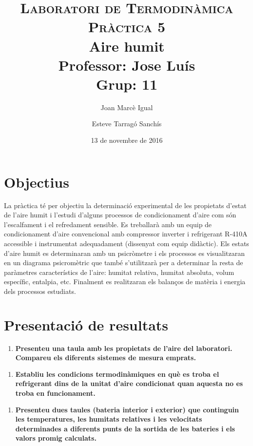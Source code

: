 \documentclass[a4paper]{article}
\title{
	\textsc{Laboratori de Termodinàmica} \\
	\textsc{Pràctica 5} \\
	Aire humit \\
	\large
	Professor: Jose Luís \\ Grup: 11 }
\author{Joan Marcè Igual \and Esteve Tarragó Sanchís}
\date{13 de novembre de 2016}
\newenvironment{questionenum}{%
	\setlist[enumerate]{resume}
	\restartlist{enumerate}
	\newcommand{\question}[1]{
		\begin{enumerate}
			\item\bfseries ##1
		\end{enumerate}
}}{%
}
\begin{document}
\maketitle

\section{Objectius}

La pràctica té per objectiu la determinació experimental de les propietats d'estat de l'aire humit i l'estudi d'alguns processos de condicionament d'aire com són l'escalfament i el refredament sensible. Es treballarà amb un equip de condicionament d'aire convencional amb compressor inverter i refrigerant R-410A accessible i instrumentat adequadament (dissenyat com equip didàctic). Els estats d'aire humit es determinaran amb un psicròmetre i els processos es visualitzaran en un diagrama psicromètric que també s'utilitzarà per a determinar la resta de paràmetres característics de l'aire: humitat relativa, humitat absoluta, volum específic, entalpia, etc. Finalment es realitzaran els balanços de matèria i energia dels processos estudiats.

\section{Presentació de resultats}

\begin{questionenum}
	\question{Presenteu una taula amb les propietats de l'aire del laboratori. Compareu els diferents sistemes de mesura emprats.}
	
	\question{Establiu les condicions termodinàmiques en què es troba el refrigerant dins de la unitat d'aire condicionat quan aquesta no es troba en funcionament.}
	
	\question{Presenteu dues taules (bateria interior i exterior) que continguin les temperatures, les humitats relatives i les velocitats determinades a diferents punts de la sortida de les bateries i els valors promig calculats.}
	
	\begin{table}[H]
		\centering
	\end{table}
\end{questionenum}
\end{document}
